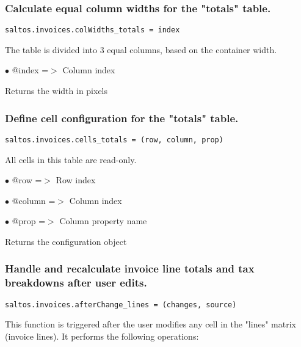 \documentclass[a4paper]{article}
\begin{document}
\hypertarget{toc161}{}
\subsubsection{Calculate equal column widths for the "totals" table.}

\begin{lstlisting}
saltos.invoices.colWidths_totals = index
\end{lstlisting}

The table is divided into 3 equal columns, based on the container width.

\begin{compactitem}
\item[\color{myblue}$\bullet$] @index =$>$ Column index
\end{compactitem}

Returns the width in pixels

\hypertarget{toc162}{}
\subsubsection{Define cell configuration for the "totals" table.}

\begin{lstlisting}
saltos.invoices.cells_totals = (row, column, prop)
\end{lstlisting}

All cells in this table are read-only.

\begin{compactitem}
\item[\color{myblue}$\bullet$] @row    =$>$ Row index
\item[\color{myblue}$\bullet$] @column =$>$ Column index
\item[\color{myblue}$\bullet$] @prop   =$>$ Column property name
\end{compactitem}

Returns the configuration object

\hypertarget{toc163}{}
\subsubsection{Handle and recalculate invoice line totals and tax breakdowns after user edits.}

\begin{lstlisting}
saltos.invoices.afterChange_lines = (changes, source)
\end{lstlisting}

This function is triggered after the user modifies any cell in the "lines" matrix
(invoice lines). It performs the following operations:
\end{document}
